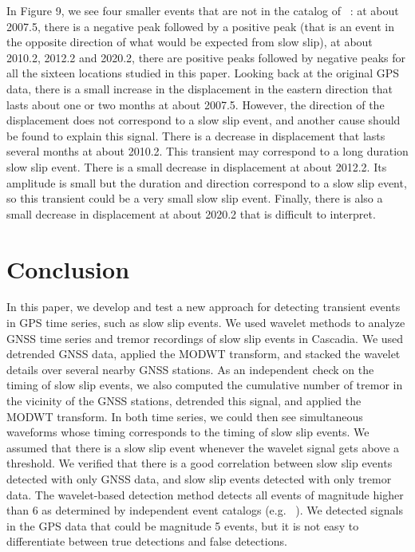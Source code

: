 \documentclass{article}
\begin{document}
In Figure 9, we see four smaller events that are not in the catalog of ~\citet{MIC_2019}: at about 2007.5, there is a negative peak followed by a positive peak (that is an event in the opposite direction of what would be expected from slow slip), at about 2010.2, 2012.2 and 2020.2, there are positive peaks followed by negative peaks for all the sixteen locations studied in this paper. Looking back at the original GPS data, there is a small increase in the displacement in the eastern direction that lasts about one or two months at about 2007.5. However, the direction of the displacement does not correspond to a slow slip event, and another cause should be found to explain this signal. There is a decrease in displacement that lasts several months at about 2010.2. This transient may correspond to a long duration slow slip event. There is a small decrease in displacement at about 2012.2. Its amplitude is small but the duration and direction correspond to a slow slip event, so this transient could be a very small slow slip event. Finally, there is also a small decrease in displacement at about 2020.2 that is difficult to interpret.

\section{Conclusion}

In this paper, we develop and test a new approach for detecting transient events in GPS time series, such as slow slip events. We used wavelet methods to analyze GNSS time series and tremor recordings of slow slip events in Cascadia. We used detrended GNSS data, applied the MODWT transform, and stacked the wavelet details over several nearby GNSS stations. As an independent check on the timing of slow slip events, we also computed the cumulative number of tremor in the vicinity of the GNSS stations, detrended this signal, and applied the MODWT transform. In both time series, we could then see simultaneous waveforms whose timing corresponds to the timing of slow slip events. We assumed that there is a slow slip event whenever the wavelet signal gets above a threshold. We verified that there is a good correlation between slow slip events detected with only GNSS data, and slow slip events detected with only tremor data. The wavelet-based detection method detects all events of magnitude higher than 6 as determined by independent event catalogs (e.g. ~\citep{MIC_2019}). We detected signals in the GPS data that could be magnitude 5 events, but it is not easy to differentiate between true detections and false detections.
\end{document}
